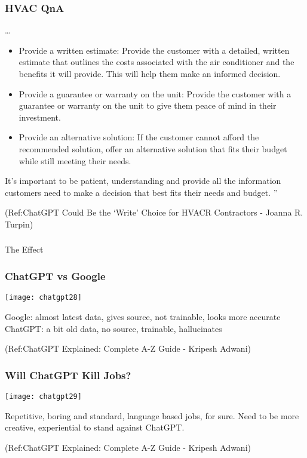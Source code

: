\begin{frame}[fragile]\frametitle{HVAC QnA}

\ldots 

\begin{itemize}
\item Provide a written estimate: Provide the customer with a detailed, written estimate that
outlines the costs associated with the air conditioner and the benefits it will provide. This will
help them make an informed decision.
\item Provide a guarantee or warranty on the unit: Provide the customer with a guarantee
or warranty on the unit to give them peace of mind in their investment.
\item Provide an alternative solution: If the customer cannot afford the recommended
solution, offer an alternative solution that fits their budget while still meeting their needs.
\end{itemize}	 
It's important to be patient, understanding and provide all the information customers need to
make a decision that best fits their needs and budget.
''

\tiny{(Ref:ChatGPT Could Be the ‘Write’ Choice for HVACR Contractors - Joanna R. Turpin)}
\end{frame}
\begin{frame}[fragile]\frametitle{}
\begin{center}
{\Large The Effect}
\end{center}
\end{frame}



\begin{frame}[fragile]\frametitle{ChatGPT vs Google}


\begin{center}
\texttt{[image: chatgpt28]}
\end{center}		

Google: almost latest data, gives source, not trainable, looks more accurate
ChatGPT: a bit old data, no source, trainable, hallucinates

\tiny{(Ref:ChatGPT Explained: Complete A-Z Guide - Kripesh Adwani)}
\end{frame}


\begin{frame}[fragile]\frametitle{Will ChatGPT Kill Jobs?}


\begin{center}
\texttt{[image: chatgpt29]}
\end{center}		

Repetitive, boring and standard, language based jobs, for sure.
Need to be more creative, experiential to stand against ChatGPT.

\tiny{(Ref:ChatGPT Explained: Complete A-Z Guide - Kripesh Adwani)}
\end{frame}


